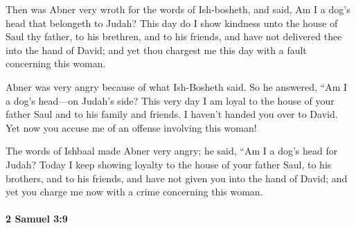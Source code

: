 			\begin{versebox}
					\item[BHS] 
					\item[ASV] Then was Abner very wroth for the words of Ish-bosheth, and said, Am I a dog's head that belongeth to Judah? This day do I show kindness unto the house of Saul thy father, to his brethren, and to his friends, and have not delivered thee into the hand of David; and yet thou chargest me this day with a fault concerning this woman.
					\item[NIV] Abner was very angry because of what Ish-Bosheth said. So he answered, “Am I a dog’s head—on Judah’s side? This very day I am loyal to the house of your father Saul and to his family and friends. I haven’t handed you over to David. Yet now you accuse me of an offense involving this woman!
					\item[NRSV] The words of Ishbaal made Abner very angry; he said, “Am I a dog’s head for Judah? Today I keep showing loyalty to the house of your father Saul, to his brothers, and to his friends, and have not given you into the hand of David; and yet you charge me now with a crime concerning this woman.
			\end{versebox}

		\paragraph{2 Samuel 3:9} %
			\label{2SAMUEL-3-9}

